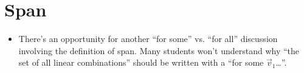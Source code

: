 	\bookonlynewpage
\section*{Span}
	\begin{annotation}
		\begin{notes}
			\begin{itemize}
				\item There's an opportunity for another ``for some'' vs. ``for all''
					discussion involving the definition of span. Many students won't
					understand why ``the set of all linear combinations'' should
					be written with a ``for some $\vec v_1$\ldots''.
			\end{itemize}
		\end{notes}
	\end{annotation}


